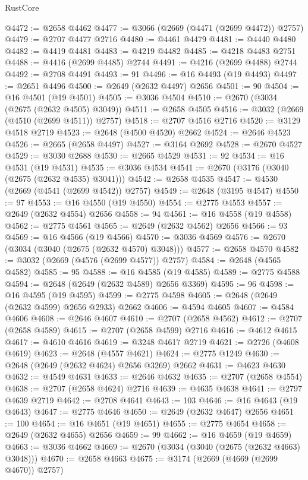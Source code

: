 \begin{lexlean}{RustCore}
\begin{coremodule}
@4472 := @2658 @4462
@4477 := @3066 (@2669 (@4471 (@2699 @4472)) @2757)
@4479 := @2707 @4477 @2716
@4480 := @4461 @4479
@4481 := @4440 @4480
@4482 := @4419 @4481
@4483 := @4219 @4482
@4485 := @4218 @4483 @2751
@4488 := @4416 (@2699 @4485) @2744
@4491 := @4216 (@2699 @4488) @2744
@4492 := @2708 @4491
@4493 := 91
@4496 := @16 @4493 (@19 @4493)
@4497 := @2651 @4496
@4500 := @2649 (@2632 @4497) @2656
@4501 := 90
@4504 := @16 @4501 (@19 @4501)
@4505 := @3036 @4504
@4510 := @2670 (@3034 (@2675 (@2632 @4505) @3049))
@4511 := @2658 @4505
@4516 := @3032 (@2669 (@4510 (@2699 @4511)) @2757)
@4518 := @2707 @4516 @2716
@4520 := @3129 @4518 @2719
@4523 := @2648 (@4500 @4520) @2662
@4524 := @2646 @4523
@4526 := @2665 (@2658 @4497)
@4527 := @3164 @2692
@4528 := @2670 @4527
@4529 := @3030 @2688
@4530 := @2665 @4529
@4531 := 92
@4534 := @16 @4531 (@19 @4531)
@4535 := @3036 @4534
@4541 := @2670 (@3176 (@3040 (@2675 (@2632 @4535) @3041)))
@4542 := @2658 @4535
@4547 := @4530 (@2669 (@4541 (@2699 @4542)) @2757)
@4549 := @2648 (@3195 @4547)
@4550 := 97
@4553 := @16 @4550 (@19 @4550)
@4554 := @2775 @4553
@4557 := @2649 (@2632 @4554) @2656
@4558 := 94
@4561 := @16 @4558 (@19 @4558)
@4562 := @2775 @4561
@4565 := @2649 (@2632 @4562) @2656
@4566 := 93
@4569 := @16 @4566 (@19 @4566)
@4570 := @3036 @4569
@4576 := @2670 (@3034 (@3040 (@2675 (@2632 @4570) @3048)))
@4577 := @2658 @4570
@4582 := @3032 (@2669 (@4576 (@2699 @4577)) @2757)
@4584 := @2648 (@4565 @4582)
@4585 := 95
@4588 := @16 @4585 (@19 @4585)
@4589 := @2775 @4588
@4594 := @2648 (@2649 (@2632 @4589) @2656 @3369)
@4595 := 96
@4598 := @16 @4595 (@19 @4595)
@4599 := @2775 @4598
@4605 := @2648 (@2649 (@2632 @4599) @2656 @2933) @2662
@4606 := @4594 @4605
@4607 := @4584 @4606
@4608 := @2646 @4607
@4610 := @2707 (@2658 @4562)
@4612 := @2707 (@2658 @4589)
@4615 := @2707 (@2658 @4599) @2716
@4616 := @4612 @4615
@4617 := @4610 @4616
@4619 := @3248 @4617 @2719
@4621 := @2726 (@4608 @4619)
@4623 := @2648 (@4557 @4621)
@4624 := @2775 @1249
@4630 := @2648 (@2649 (@2632 @4624) @2656 @3269) @2662
@4631 := @4623 @4630
@4632 := @4549 @4631
@4633 := @2646 @4632
@4635 := @2707 (@2658 @4554)
@4638 := @2707 (@2658 @4624) @2716
@4639 := @4635 @4638
@4641 := @2797 @4639 @2719
@4642 := @2708 @4641
@4643 := 103
@4646 := @16 @4643 (@19 @4643)
@4647 := @2775 @4646
@4650 := @2649 (@2632 @4647) @2656
@4651 := 100
@4654 := @16 @4651 (@19 @4651)
@4655 := @2775 @4654
@4658 := @2649 (@2632 @4655) @2656
@4659 := 99
@4662 := @16 @4659 (@19 @4659)
@4663 := @3036 @4662
@4669 := @2670 (@3034 (@3040 (@2675 (@2632 @4663) @3048)))
@4670 := @2658 @4663
@4675 := @3174 (@2669 (@4669 (@2699 @4670)) @2757)

\end{coremodule}
\end{lexlean}
